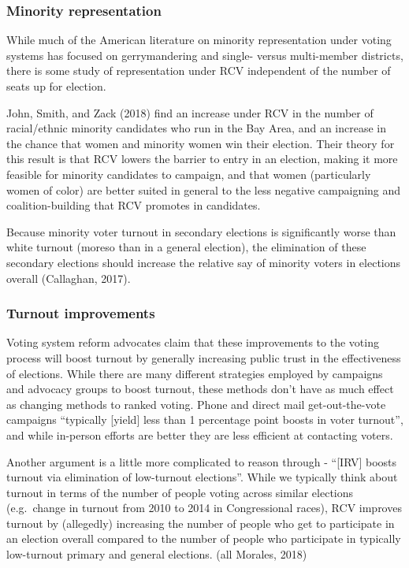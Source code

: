 \documentclass[12pt,twoside]{reedthesis}
\theoremstyle{definition}
\theoremstyle{definition}
\theoremstyle{definition}
\theoremstyle{remark}
\begin{document}
\hypertarget{minority-representation}{%
\subsubsection{Minority representation}\label{minority-representation}}

While much of the American literature on minority representation under
voting systems has focused on gerrymandering and single- versus
multi-member districts, there is some study of representation under RCV
independent of the number of seats up for election.

John, Smith, and Zack (2018) find an increase under RCV in the number of
racial/ethnic minority candidates who run in the Bay Area, and an
increase in the chance that women and minority women win their election.
Their theory for this result is that RCV lowers the barrier to entry in
an election, making it more feasible for minority candidates to
campaign, and that women (particularly women of color) are better suited
in general to the less negative campaigning and coalition-building that
RCV promotes in candidates.

Because minority voter turnout in secondary elections is significantly
worse than white turnout (moreso than in a general election), the
elimination of these secondary elections should increase the relative
say of minority voters in elections overall (Callaghan, 2017).

\hypertarget{turnout-improvements}{%
\subsubsection{Turnout improvements}\label{turnout-improvements}}

Voting system reform advocates claim that these improvements to the
voting process will boost turnout by generally increasing public trust
in the effectiveness of elections. While there are many different
strategies employed by campaigns and advocacy groups to boost turnout,
these methods don't have as much effect as changing methods to ranked
voting. Phone and direct mail get-out-the-vote campaigns ``typically
{[}yield{]} less than 1 percentage point boosts in voter turnout'', and
while in-person efforts are better they are less efficient at contacting
voters.

Another argument is a little more complicated to reason through -
``{[}IRV{]} boosts turnout via elimination of low-turnout elections''.
While we typically think about turnout in terms of the number of people
voting across similar elections (e.g.~change in turnout from 2010 to
2014 in Congressional races), RCV improves turnout by (allegedly)
increasing the number of people who get to participate in an election
overall compared to the number of people who participate in typically
low-turnout primary and general elections. (all Morales, 2018)
\end{document}
